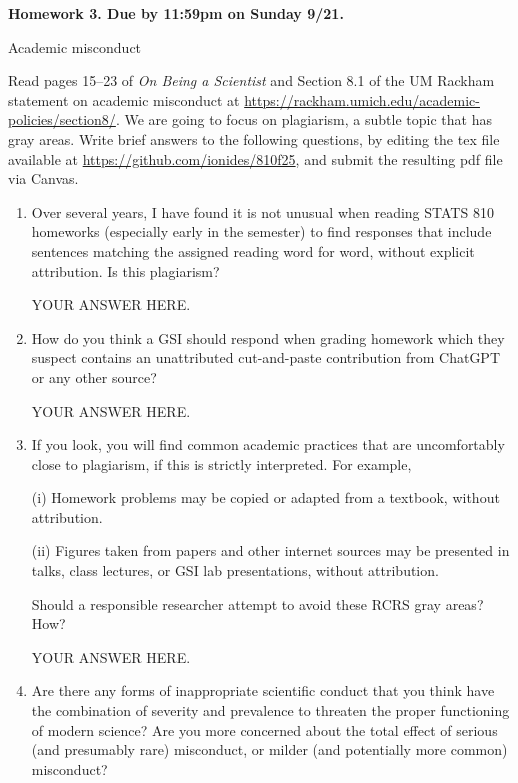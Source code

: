 \documentclass[12pt]{article}
\begin{document}
\begin{center}\bf
Homework 3. Due by 11:59pm on Sunday 9/21.

Academic misconduct

\end{center}
Read pages 15--23 of {\em On Being a Scientist} and Section 8.1 of the UM Rackham statement on academic misconduct at \url{https://rackham.umich.edu/academic-policies/section8/}. We are going to focus on plagiarism, a subtle topic that has gray areas. Write brief answers to the following questions, by editing the tex file available at \url{https://github.com/ionides/810f25}, and submit the resulting pdf file via Canvas. 

\begin{enumerate}

\item Over several years, I have found it is not unusual when reading STATS 810 homeworks (especially early in the semester) to find responses that include sentences matching the assigned reading word for word, without explicit attribution. Is this plagiarism?

YOUR ANSWER HERE.

\item How do you think a GSI should respond when grading homework which they suspect contains an unattributed cut-and-paste contribution from ChatGPT or any other source?

YOUR ANSWER HERE.

\item If you look, you will find common academic practices that are uncomfortably close to plagiarism, if this is strictly interpreted. For example,

(i) Homework problems may be copied or adapted from a textbook, without attribution.

(ii) Figures taken from papers and other internet sources may be presented in talks, class lectures, or GSI lab presentations, without attribution.

Should a responsible researcher attempt to avoid these RCRS gray areas? How?
  
YOUR ANSWER HERE.

\item Are there any forms of inappropriate scientific conduct that you think have the combination of severity and prevalence to threaten the proper functioning of modern science? Are you more concerned about the total effect of serious (and presumably rare) misconduct, or milder (and potentially more common) misconduct?


\end{enumerate}
\end{document}
